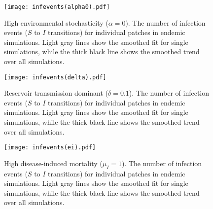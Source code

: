 \documentclass{svjour3}
\begin{document}
\begin{figure}
\centering
\texttt{[image: infevents(alpha0).pdf]}
\caption{High environmental stochasticity ($\alpha = 0$).  The number of infection events ($S$ to $I$ transitions) for individual patches in endemic simulations.  Light gray lines show the smoothed fit for single simulations, while the thick black line shows the smoothed trend over all simulations.}
\label{infections_x0}
\end{figure}

\begin{figure}
\centering
\texttt{[image: infevents(delta).pdf]}
\caption{Reservoir transmission dominant ($\delta = 0.1$).  The number of infection events ($S$ to $I$ transitions) for individual patches in endemic simulations.  Light gray lines show the smoothed fit for single simulations, while the thick black line shows the smoothed trend over all simulations.}
\label{infections_delta}
\end{figure}

\begin{figure}
\centering
\texttt{[image: infevents(ei).pdf]}
\caption{High disease-induced mortality ($\mu_I = 1$).  The number of infection events ($S$ to $I$ transitions) for individual patches in endemic simulations.  Light gray lines show the smoothed fit for single simulations, while the thick black line shows the smoothed trend over all simulations.}
\label{infections_ei}
\end{figure}


\clearpage

     
\end{document}
